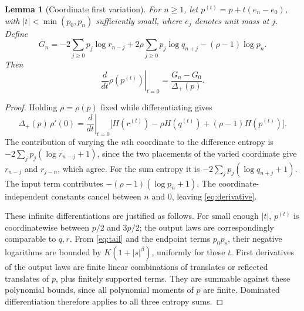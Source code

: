 \documentclass[11pt]{article}
\newtheorem{lemma}[theorem]{Lemma}
\theoremstyle{remark}\newtheorem{remark}[theorem]{Remark}
\newcommand{\Dplus}{\Delta_+}
\begin{document}
\begin{lemma}[Coordinate first variation]\label{lem:variation}
For $n\geq1$, let $p^{(t)}=p+t(e_n-e_0)$, with
$|t|<\min(p_0,p_n)$ sufficiently small, where $e_j$ denotes unit mass at $j$.
Define
\begin{equation}\label{eq:gradient}
 G_n=-2\sum_{j\geq0}p_j\log r_{n-j}
       +2\rho\sum_{j\geq0}p_j\log q_{n+j}
       -(\rho-1)\log p_n.
\end{equation}
Then
\begin{equation}\label{eq:derivative}
 \left.\frac{d}{dt}\rho(p^{(t)})\right|_{t=0}
 =\frac{G_n-G_0}{\Dplus(p)}.
\end{equation}
\end{lemma}
\begin{proof}
Holding $\rho=\rho(p)$ fixed while differentiating gives
\[
 \Dplus(p)\,\rho'(0)
 =\left.\frac{d}{dt}\right|_{t=0}
 \bigl[H(r^{(t)})-\rho H(q^{(t)})+(\rho-1)H(p^{(t)})\bigr].
\]
The contribution of varying the $n$th coordinate to the difference entropy
is $-2\sum_jp_j(\log r_{n-j}+1)$, since the two placements of the varied
coordinate give $r_{n-j}$ and $r_{j-n}$, which agree. For the sum entropy
it is $-2\sum_jp_j(\log q_{n+j}+1)$. The input term contributes
$-(\rho-1)(\log p_n+1)$. The coordinate-independent constants cancel
between $n$ and $0$, leaving \eqref{eq:derivative}.

These infinite differentiations are justified as follows. For small enough
$|t|$, $p^{(t)}$ is coordinatewise between $p/2$ and $3p/2$; the output laws
are correspondingly comparable to $q,r$. From \eqref{eq:tail} and the
endpoint terms $p_0p_s$, their negative logarithms are bounded by
$K(1+|s|^\beta)$, uniformly for these $t$. First derivatives of the output
laws are finite linear combinations of translates or reflected translates
of $p$, plus finitely supported terms. They are summable against these
polynomial bounds, since all polynomial moments of $p$ are finite.
Dominated differentiation therefore applies to all three entropy sums.
\end{proof}
\end{document}
